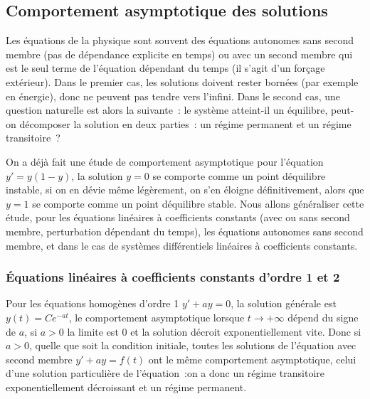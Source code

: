 \documentclass[a4paper,11pt]{article}
\begin{document}
\begin{giacjshere}
\subsection{Comportement asymptotique des solutions}
Les \'equations de la physique sont souvent des \'equations
autonomes sans second membre (pas de d\'ependance explicite en temps) 
ou avec un second membre
qui est le seul terme de l'\'equation d\'ependant du temps (il
s'agit d'un for\c{c}age ext\'erieur). Dans le premier cas,
les solutions doivent rester born\'ees (par exemple en \'energie), donc
ne peuvent pas tendre vers l'infini. Dans le second cas,
une question naturelle
est alors la suivante~: le syst\`eme atteint-il un \'equilibre,
peut-on d\'ecomposer la solution en deux parties~: un r\'egime
permanent et un r\'egime transitoire~?

On a d\'ej\`a fait une \'etude de comportement asymptotique
pour l'\'equation $y'=y(1-y)$, la solution $y=0$ se comporte
comme un point d\'equilibre instable, si on en d\'evie m\^eme
l\'eg\`erement, on s'en \'eloigne d\'efinitivement, alors que $y=1$ se
comporte comme un point d\'equilibre stable.
Nous allons g\'en\'eraliser cette \'etude, pour les \'equations
lin\'eaires \`a coefficients constants (avec ou sans second membre,
perturbation d\'ependant du temps),
les \'equations autonomes sans second membre,
et dans le cas de syst\`emes diff\'erentiels lin\'eaires \`a
coefficients constants.

\subsubsection{\'Equations lin\'eaires \`a coefficients constants 
d'ordre 1 et 2}
Pour les \'equations homog\`enes d'ordre 1 $y'+ay=0$, 
la solution g\'en\'erale est $y(t)=Ce^{-at}$, le comportement
asymptotique lorsque $t \rightarrow +\infty$ d\'epend du signe
de $a$, si $a>0$ la limite est 0 et la solution d\'ecroit
exponentiellement vite. Donc si $a>0$, quelle
que soit la condition initiale, toutes les solutions de 
l'\'equation avec second membre $y'+ay=f(t)$ ont
le m\^eme comportement asymptotique, celui
d'une solution particuli\`ere de l'\'equation~:on a donc
un r\'egime transitoire exponentiellement d\'ecroissant
et un r\'egime permanent.


\end{giacjshere}
\end{document}
